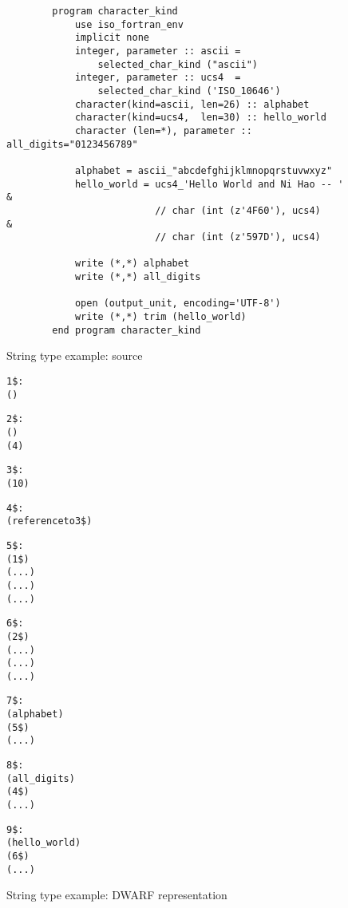 \begin{figure}[h]
\begin{lstlisting}
        program character_kind
            use iso_fortran_env
            implicit none
            integer, parameter :: ascii = 
                selected_char_kind ("ascii")
            integer, parameter :: ucs4  = 
                selected_char_kind ('ISO_10646')
            character(kind=ascii, len=26) :: alphabet
            character(kind=ucs4,  len=30) :: hello_world
            character (len=*), parameter :: all_digits="0123456789"
              
            alphabet = ascii_"abcdefghijklmnopqrstuvwxyz"
            hello_world = ucs4_'Hello World and Ni Hao -- ' &
                          // char (int (z'4F60'), ucs4)     &
                          // char (int (z'597D'), ucs4)
              
            write (*,*) alphabet
            write (*,*) all_digits
              
            open (output_unit, encoding='UTF-8')
            write (*,*) trim (hello_world)
        end program character_kind
\end{lstlisting}
\caption{String type example: source}
\label{fig:stringtypeexamplesource}
\end{figure}

\begin{figure}[h]
\begin{dwflisting}
\begin{alltt}

1\$: \DWTAGbasetype
        \DWATencoding (\DWATEASCII)

2\$: \DWTAGbasetype
        \DWATencoding (\DWATEUCS)
        \DWATbytesize (4)

3\$: \DWTAGstringtype
        \DWATbytesize (10)

4\$: \DWTAGconsttype
        \DWATtype (reference to 3\$)
      
5\$: \DWTAGstringtype
        \DWATtype (1\$)
        \DWATstringlength ( ... )
        \DWATstringlengthbytesize ( ... )
        \DWATdatalocation ( ... )
      
6\$: \DWTAGstringtype
        \DWATtype (2\$)
        \DWATstringlength ( ... )
        \DWATstringlengthbytesize ( ... )
        \DWATdatalocation ( ... )

7\$: \DWTAGvariable
        \DWATname (alphabet)
        \DWATtype (5\$)
        \DWATlocation ( ... )

8\$: \DWTAGconstant
        \DWATname (all\_digits)
        \DWATtype (4\$)
        \DWATconstvalue ( ... )

9\$: \DWTAGvariable
        \DWATname (hello\_world)
        \DWATtype (6\$)
        \DWATlocation ( ... )
        
\end{alltt}
\end{dwflisting}
\caption{String type example: DWARF representation}
\label{fig:stringtypeexampledwarf}
\end{figure}

